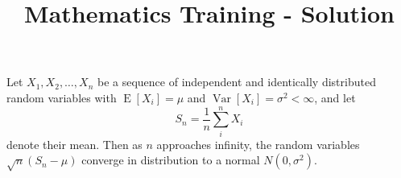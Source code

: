 \documentclass{article}
\title{Mathematics Training - Solution}
\begin{document}
Let $X_1, X_2, \ldots, X_n$ be a sequence of independent and
identically distributed random variables with
$\operatorname{E}[X_i] = \mu$ and
$\operatorname{Var}[X_i] = \sigma^2 < \infty$, and let
\begin{equation*}
S_n = \frac{1}{n}\sum_{i}^{n} X_i
\end{equation*}
denote their mean. Then as $n$ approaches infinity, the
random variables $\sqrt{n}(S_n - \mu)$ converge in
distribution to a normal $N(0, \sigma^2)$.

\end{document}
